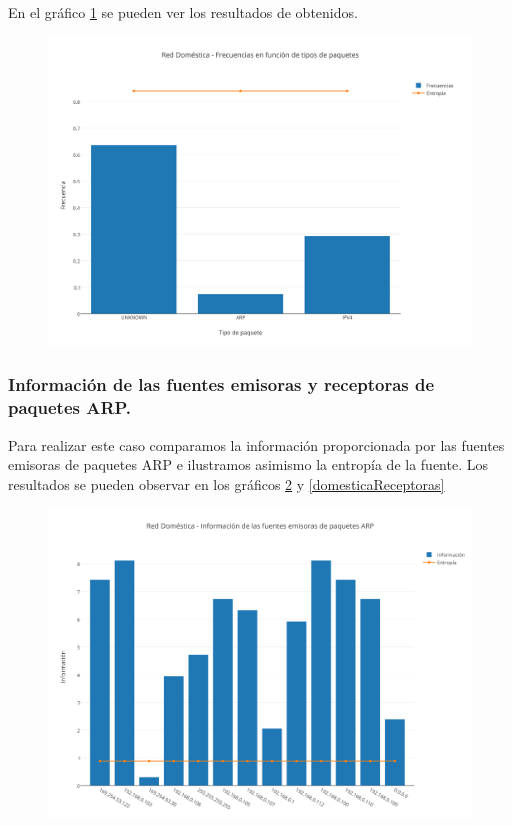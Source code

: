 En el gr\'afico \ref{domesticaPaquetes} se pueden ver los resultados de obtenidos.

\begin{figure}[h!]
    \centering                                                       
    \includegraphics[width=400pt]{img/DomesticaFrecuenciaVsTipoPaquetes}
    \caption{}
    \label{domesticaPaquetes}
\end{figure}

\subsubsection{Informaci\'on de las fuentes emisoras y receptoras de paquetes ARP.}

Para realizar este caso comparamos la informaci\'on proporcionada por las fuentes emisoras de paquetes ARP e ilustramos asimismo la entrop\'ia de la fuente. Los resultados se pueden observar en los gr\'aficos \ref{domesticaEmisoras} y \ref{domesticaReceptoras}

\begin{figure}[h!]
    \centering                                                       
    \includegraphics[width=400pt]{img/RedDomesticaFuentesEmisorasARP}
    \caption{}
    \label{domesticaEmisoras}
\end{figure}

